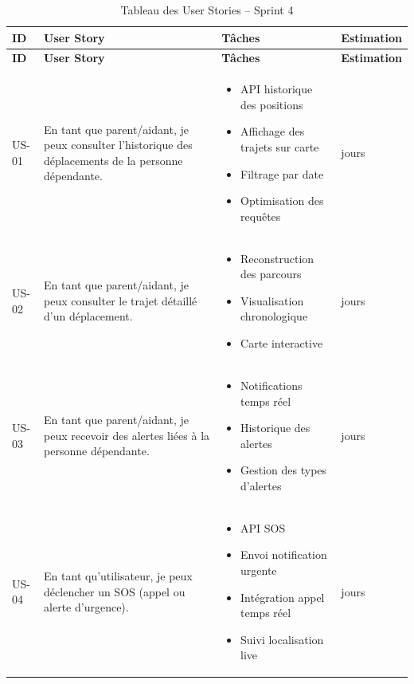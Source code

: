\small
\setlength{\tabcolsep}{3pt}
\renewcommand{\arraystretch}{1.0}
\setlength{\parskip}{0pt}
\begin{longtable}{|>{\centering\arraybackslash}p{}|>{\raggedright\arraybackslash}p{}|>{\raggedright\arraybackslash}p{}|>{\centering\arraybackslash}p{}|}
\caption{Tableau des User Stories – Sprint 4} \\
\hline
\textbf{ID} & \textbf{User Story} & \textbf{Tâches} & \textbf{Estimation} \\ \hline
\endfirsthead

\hline
\textbf{ID} & \textbf{User Story} & \textbf{Tâches} & \textbf{Estimation} \\ \hline
\endhead

\hline
\endlastfoot

US-01 & En tant que parent/aidant, je peux consulter l’historique des déplacements de la personne dépendante.
& \begin{itemize}[leftmargin=*, nosep]
\item API historique des positions
\item Affichage des trajets sur carte
\item Filtrage par date
\item Optimisation des requêtes
\end{itemize}
& 3 jours \\ \hline

US-02 & En tant que parent/aidant, je peux consulter le trajet détaillé d’un déplacement.
& \begin{itemize}[leftmargin=*, nosep]
\item Reconstruction des parcours
\item Visualisation chronologique
\item Carte interactive
\end{itemize}
& 2 jours \\ \hline

US-03 & En tant que parent/aidant, je peux recevoir des alertes liées à la personne dépendante.
& \begin{itemize}[leftmargin=*, nosep]
\item Notifications temps réel
\item Historique des alertes
\item Gestion des types d’alertes
\end{itemize}
& 3 jours \\ \hline

US-04 & En tant qu’utilisateur, je peux déclencher un SOS (appel ou alerte d’urgence).
& \begin{itemize}[leftmargin=*, nosep]
\item API SOS
\item Envoi notification urgente
\item Intégration appel temps réel
\item Suivi localisation live
\end{itemize}
& 4 jours \\ \hline


\end{longtable}
